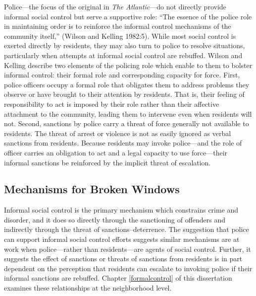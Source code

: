 \documentclass [11pt, proquest] {uwthesis}[2015/03/03]
\begin{document}
Police---the focus of the original in \emph{The Atlantic}---do not directly provide informal social control but serve a supportive role: ``The essence of the police role in maintaining order is to reinforce the informal control mechanisms of the community itself,'' (Wilson and Kelling 1982:5). While most social control is exerted directly by residents, they may also turn to police to resolve situations, particularly when attempts at informal social control are rebuffed. Wilson and Kelling describe two elements of the policing role which enable to them to bolster informal control: their formal role and corresponding capacity for force. First, police officers occupy a formal role that obligates them to address problems they observe or have brought to their attention by residents. That is, their feeling of responsibility to act is imposed by their role rather than their affective attachment to the community, leading them to intervene even when residents will not. Second, sanctions by police carry a threat of force generally not available to residents. The threat of arrest or violence is not as easily ignored as verbal sanctions from residents. Because residents may invoke police---and the role of officer carries an obligation to act and a legal capacity to use force---their informal sanctions be reinforced by the implicit threat of escalation.

\hypertarget{mechanisms-for-broken-windows}{%
\subsection{Mechanisms for Broken Windows}\label{mechanisms-for-broken-windows}}

Informal social control is the primary mechanism which constrains crime and disorder, and it does so directly through the sanctioning of offenders and indirectly through the threat of sanctions--deterrence. The suggestion that police can support informal social control efforts suggests similar mechanisms are at work when police---rather than residents---are agents of social control. Further, it suggests the effect of sanctions or threats of sanctions from residents is in part dependent on the perception that residents can escalate to invoking police if their informal sanctions are rebuffed. Chapter \ref{formalcontrol} of this dissertation examines these relationships at the neighborhood level.
\end{document}
